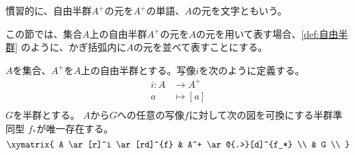 	慣習的に、自由半群$A^+$の元を$A^+$の単語、$A$の元を文字ともいう。

	この節では、集合$A$上の自由半群$A^+$の元を$A$の元を用いて表す場合、\ref{def:自由半群}
	のように、かぎ括弧内に$A$の元を並べて表すことにする。

	\begin{proposition}[自由半群の普遍性]\label{pro:自由半群の普遍性} %
		$A$を集合、$A^+$を$A$上の自由半群とする。写像$i$を次のように定義する。
		\begin{equation}\begin{split} %
			i: A &\to A^+ \\
				a &\mapsto [a] \\
		\end{split}\end{equation} %
		$G$を半群とする。
		$A$から$G$への任意の写像$f$に対して次の図を可換にする半群準同型
		$f_*$が唯一存在する。
		\begin{equation}\xymatrix{
			A \ar[r]^i \ar[rd]^{f} & A^+ \ar@{.>}[d]^{f_*} \\
			& G \\
		}\end{equation}
	\end{proposition} %
